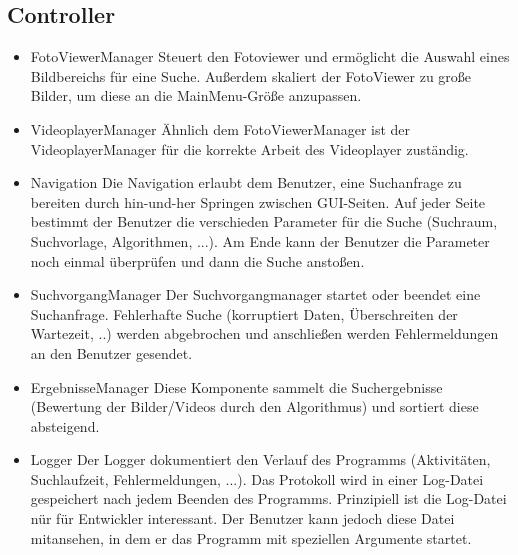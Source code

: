 \subsection{Controller}
\begin{itemize}
\item FotoViewerManager \newline
Steuert den Fotoviewer und ermöglicht die Auswahl eines Bildbereichs für eine Suche. Außerdem skaliert der FotoViewer zu große Bilder, um diese an die MainMenu-Größe anzupassen. 
\item VideoplayerManager \newline
Ähnlich dem FotoViewerManager ist der VideoplayerManager für die korrekte Arbeit des Videoplayer zuständig.
\item Navigation \newline
Die Navigation erlaubt dem Benutzer, eine Suchanfrage zu bereiten durch hin-und-her Springen zwischen  GUI-Seiten. Auf jeder Seite bestimmt der Benutzer die verschieden Parameter für die Suche (Suchraum, Suchvorlage, Algorithmen, ...). Am Ende kann der Benutzer die Parameter noch einmal überprüfen und dann die Suche anstoßen.
\item SuchvorgangManager \newline
Der Suchvorgangmanager startet oder beendet eine Suchanfrage. Fehlerhafte Suche (korruptiert Daten, Überschreiten der Wartezeit, ..) werden abgebrochen und anschließen werden Fehlermeldungen an den Benutzer gesendet.
\item ErgebnisseManager \newline
Diese Komponente sammelt die Suchergebnisse (Bewertung der Bilder/Videos durch den Algorithmus) und sortiert diese absteigend.
\item Logger \newline
Der Logger dokumentiert den Verlauf des Programms (Aktivitäten, Suchlaufzeit, Fehlermeldungen, ...). Das Protokoll wird in einer Log-Datei gespeichert nach jedem Beenden des Programms. Prinzipiell ist die Log-Datei nür für Entwickler interessant. Der Benutzer kann jedoch diese Datei mitansehen, in dem er das Programm mit speziellen Argumente startet.
\end{itemize}
\pagebreak

